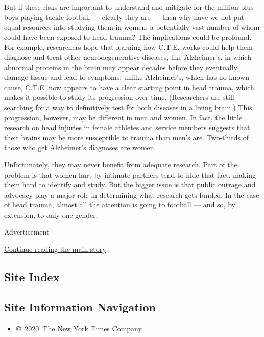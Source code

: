 But if these risks are important to understand and mitigate for the
million-plus boys playing tackle football --- clearly they are --- then
why have we not put equal resources into studying them in women, a
potentially vast number of whom could have been exposed to head trauma?
The implications could be profound. For example, researchers hope that
learning how C.T.E. works could help them diagnose and treat other
neurodegenerative diseases, like Alzheimer's, in which abnormal proteins
in the brain may appear decades before they eventually damage tissue and
lead to symptoms; unlike Alzheimer's, which has no known cause, C.T.E.
now appears to have a clear starting point in head trauma, which makes
it possible to study its progression over time. (Researchers are still
searching for a way to definitively test for both diseases in a living
brain.) This progression, however, may be different in men and women. In
fact, the little research on head injuries in female athletes and
service members suggests that their brains may be more susceptible to
trauma than men's are. Two-thirds of those who get Alzheimer's diagnoses
are women.

Unfortunately, they may never benefit from adequate research. Part of
the problem is that women hurt by intimate partners tend to hide that
fact, making them hard to identify and study. But the bigger issue is
that public outrage and advocacy play a major role in determining what
research gets funded. In the case of head trauma, almost all the
attention is going to football --- and so, by extension, to only one
gender.

Advertisement

\protect\hyperlink{after-bottom}{Continue reading the main story}

\hypertarget{site-index}{%
\subsection{Site Index}\label{site-index}}

\hypertarget{site-information-navigation}{%
\subsection{Site Information
Navigation}\label{site-information-navigation}}

\begin{itemize}
\tightlist
\item
  \href{https://help.nytimes3xbfgragh.onion/hc/en-us/articles/115014792127-Copyright-notice}{©~2020~The
  New York Times Company}
\end{itemize}

